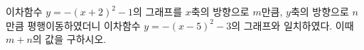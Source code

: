 이차함수 $y=-(x+2)^2-1$의 그래프를 $x$축의 방향으로 $m$만큼, $y$축의 방향으로 $n$만큼 평행이동하였더니 이차함수 $y=-(x-5)^2-3$의 그래프와 일치하였다. 이때 $m+n$의 값을 구하시오.
